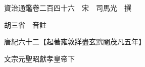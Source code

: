 










 


 
 


 

  
  
  
  
  





  
  
  
  
  
 
  

  

  
  
  



  

 
 

  
   




  

  
  


  　　資治通鑑卷二百四十六　宋　司馬光　撰

　　胡三省　音註

　　唐紀六十二【起著雍敦牂盡玄黓閹茂凡五年】

　　文宗元聖昭獻孝皇帝下

